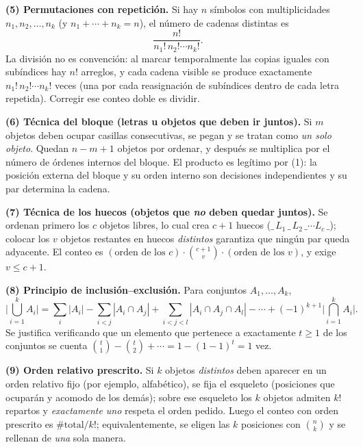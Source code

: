 \documentclass[11pt]{article}
\begin{document}
\begin{teo}
\medskip
\textbf{(5) Permutaciones con repetici\'on.} Si hay $n$ s\'imbolos con multiplicidades
$n_1,n_2,\dots,n_k$ (y $n_1+\cdots+n_k=n$), el n\'umero de cadenas distintas es
\[
\frac{n!}{n_1!\,n_2!\cdots n_k!}.
\]
La divisi\'on no es convenci\'on: al marcar temporalmente las copias iguales con sub\'indices hay $n!$
arreglos, y cada cadena visible se produce exactamente $n_1!\,n_2!\cdots n_k!$ veces (una por cada
reasignaci\'on de sub\'indices dentro de cada letra repetida). Corregir ese conteo doble es dividir.

\medskip
\textbf{(6) T\'ecnica del bloque (letras u objetos que deben ir juntos).} Si $m$ objetos deben ocupar
casillas consecutivas, se pegan y se tratan como \emph{un solo objeto}. Quedan $n-m+1$ objetos por ordenar,
y despu\'es se multiplica por el n\'umero de \'ordenes internos del bloque. El producto es leg\'itimo por
(1): la posici\'on externa del bloque y su orden interno son decisiones independientes y su par determina la
cadena.

\medskip
\textbf{(7) T\'ecnica de los huecos (objetos que \emph{no} deben quedar juntos).} Se ordenan primero los $c$
objetos libres, lo cual crea $c+1$ huecos ($\_\,L_1\,\_\,L_2\,\_\cdots L_c\,\_$); colocar los $v$ objetos
restantes en huecos \emph{distintos} garantiza que ning\'un par queda adyacente. El conteo es
$(\text{orden de los }c)\cdot\binom{c+1}{v}\cdot(\text{orden de los }v)$, y exige $v\le c+1$.

\medskip
\textbf{(8) Principio de inclusi\'on--exclusi\'on.} Para conjuntos $A_1,\dots,A_k$,
\[
\Big|\bigcup_{i=1}^{k}A_i\Big|
=\sum_{i}|A_i|-\sum_{i<j}|A_i\cap A_j|+\sum_{i<j<l}|A_i\cap A_j\cap A_l|-\cdots+(-1)^{k+1}\Big|\bigcap_{i=1}^{k}A_i\Big| .
\]
Se justifica verificando que un elemento que pertenece a exactamente $t\ge 1$ de los conjuntos se cuenta
$\binom{t}{1}-\binom{t}{2}+\cdots = 1-(1-1)^t = 1$ vez.

\medskip
\textbf{(9) Orden relativo prescrito.} Si $k$ objetos \emph{distintos} deben aparecer en un orden relativo
fijo (por ejemplo, alfab\'etico), se fija el esqueleto (posiciones que ocupar\'an y acomodo de los dem\'as);
sobre ese esqueleto los $k$ objetos admiten $k!$ repartos y \emph{exactamente uno} respeta el orden pedido.
Luego el conteo con orden prescrito es $\#\text{total}/k!$; equivalentemente, se eligen las $k$ posiciones
con $\binom{n}{k}$ y se rellenan de \emph{una} sola manera.
\end{teo}
\end{document}
